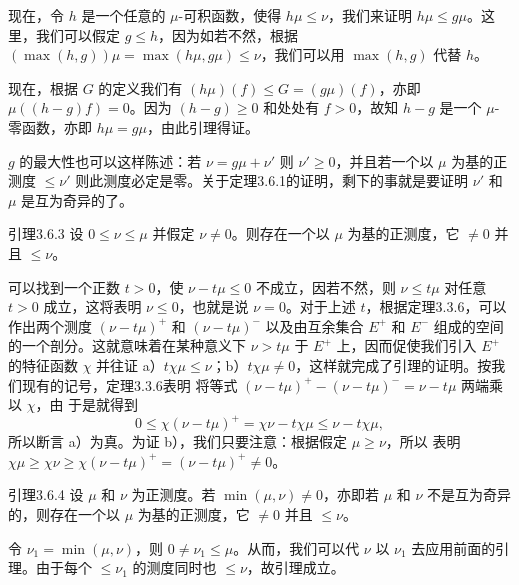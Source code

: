 现在，令 $h$ 是一个任意的 $\mu$-可积函数，使得 $h\mu\le\nu$，我们来证明 $h\mu\le g\mu$。这里，我们可以假定 $g\le h$，因为如若不然，根据 $(\max(h,g))\mu=\max(h\mu,g\mu)\le\nu$，我们可以用 $\max(h,g)$ 代替
$h$。

现在，根据 $G$ 的定义我们有 $(h\mu)(f)\le G=(g\mu)(f)$，亦即 $\mu((h-g)f)=0$。因为 $(h-g)\ge0$ 和处处有 $f>0$，故知 $h-g$ 是一个 $\mu$-零函数，亦即 $h\mu=g\mu$，由此引理得证。

$g$ 的最大性也可以这样陈述：若 $\nu=g\mu+\nu'$ 则 $\nu'\ge0$，并且若一个以 $\mu$ 为基的正测度 $\le\nu'$ 则此测度必定是零。关于定理3.6.1的证明，剩下的事就是要证明 $\nu'$ 和 $\mu$ 是互为奇异的了。
\begin{statement}{引理}{3.6.3}
设 $0\le\nu\le\mu$ 并假定 $\nu\ne0$。则存在一个以 $\mu$ 为基的正测度，它 $\ne0$ 并且 $\le\nu$。
\end{statement}
\Proof 可以找到一个正数 $t>0$，使 $\nu-t\mu\le0$ 不成立，因若不然，则 $\nu\le t\mu$ 对任意 $t>0$ 成立，这将表明 $\nu\le0$，也就是说 $\nu=0$。对于上述 $t$，根据定理3.3.6，可以作出两个测度 $(\nu-t\mu)^+$ 和 $(\nu-t\mu)^-$ 以及由互余集合 $E^+$ 和 $E^-$ 组成的空间的一个剖分。这就意味着在某种意义下 $\nu>t\mu$ 于 $E^+$ 上，因而促使我们引入 $E^+$ 的特征函数 $\chi$ 并往证 a）$t\chi\mu\le\nu$；b）$t\chi\mu\ne0$，这样就完成了引理的证明。按我们现有的记号，定理3.3.6表明
将等式 $(\nu-t\mu)^+-(\nu-t\mu)^-=\nu-t\mu$ 两端乘以 $\chi$，由  于是就得到
\[0\le\chi(\nu-t\mu)^+=\chi\nu-t\chi\mu\le\nu-t\chi\mu,\]
所以断言 a）为真。为证 b），我们只要注意：根据假定 $\mu\ge\nu$，所以  表明 $\chi\mu\ge\chi\nu\ge\chi(\nu-t\mu)^+=(\nu-t\mu)^+\ne0$。
\begin{statement}{引理}{3.6.4}
设 $\mu$ 和 $\nu$ 为正测度。若 $\min(\mu,\nu)\ne0$，亦即若 $\mu$ 和 $\nu$ 不是互为奇异的，则存在一个以 $\mu$ 为基的正测度，它 $\ne0$ 并且 $\le\nu$。
\end{statement}
\Proof 令 $\nu_1=\min(\mu,\nu)$，则 $0\ne\nu_1\le\mu$。从而，我们可以代
$\nu$ 以 $\nu_1$ 去应用前面的引理。由于每个 $\le\nu_1$ 的测度同时也 $\le\nu$，故引理成立。

